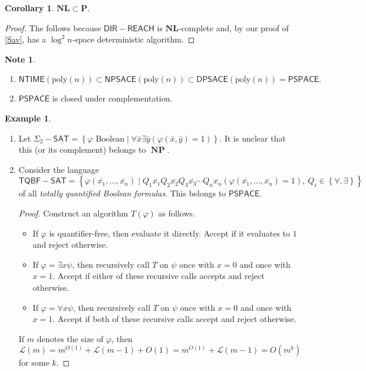 \documentclass[10pt,letterpaper,cm]{nupset}
\theoremstyle{definition}
\newtheorem{exmp}[definition]{Example}
\newtheorem{note}[definition]{Note}
\theoremstyle{theorem}
\newtheorem{corollary}[definition]{Corollary}
\theoremstyle{remark}
\newcommand{\1}{\mathbf{1}}
\newcommand{\0}{\vec 0}
\DeclareMathOperator{\NP}{\mathbf{NP}}
\begin{document}
\begin{corollary}
$\mathbf{NL} \subset \mathbf{P}$.
\end{corollary}
\begin{proof}
The follows because $\mathsf{DIR{-}REACH}$ is  $\mathbf{NL}$-complete and, by our proof of \cref{Sav}, has a $\log^2{n}$-space deterministic algorithm.
\end{proof}

\begin{note} $ $
\begin{enumerate}
\item $\mathsf{NTIME}(\text{poly}(n)) \subset \mathsf{NPSACE}(\text{poly}(n)) \subset \mathsf{DPSACE}(\text{poly}(n)) = \mathsf{PSPACE}.$
\item $\mathsf{PSPACE}$ is closed under complementation. 
\end{enumerate}
\end{note}

\begin{exmp} $ $
\begin{enumerate}
\item Let $\Sigma_2{-}\mathsf{SAT} = \left\{\varphi \text{ Boolean} \mid \forall \bar{x} \exists \bar{y}\left(\varphi(\bar{x}, \bar{y}) = 1\right)\right\}$. It is unclear that this (or its complement) belongs to $\NP$. 
\item Consider the language $$\mathsf{TQBF{-}SAT} = \left\{ \varphi\left(\overline{x_1}, \ldots, \overline{x_n}\right) \mid Q_1 \overline{x_1} Q_2 \overline{x_2}Q_3 \overline{x_3} \cdots Q_n \overline{x_n} \left(\varphi\left(\overline{x_1}, \ldots, \overline{x_n}\right) = 1\right), \ Q_i \in \left\{\forall, \exists\right\} \right\}$$  of all \textit{totally quantified Boolean formulas}. This belongs to $\mathsf{PSPACE}$.
\begin{proof}
Construct an algorithm $T(\varphi)$ as follows. 
\begin{itemize}
\item If $\varphi$ is quantifier-free, then evaluate it directly. Accept if it evaluates to $1$ and reject otherwise. 
\item If $\varphi = \exists x \psi$, then recursively call $T$ on $\psi$ once with $x=0$ and once with $x=1$. Accept if either of these recursive calls accepts and reject otherwise. 
\item If  $\varphi = \forall x \psi$, then recursively call $T$ on $\psi$ once with $x=0$ and once with $x=1$. Accept if both of these recursive calls accept and reject otherwise. 
\end{itemize} 
If $m$ denotes the size of $\varphi$, then $$\mathcal{L}(m) = m^{O(1)} + \mathcal{L}(m-1) + O(1) = m^{O(1)} + \mathcal{L}(m-1) = O\left(m^k\right)$$ for some $k$.
\end{proof}
\end{enumerate}
\end{exmp}
\end{document}
